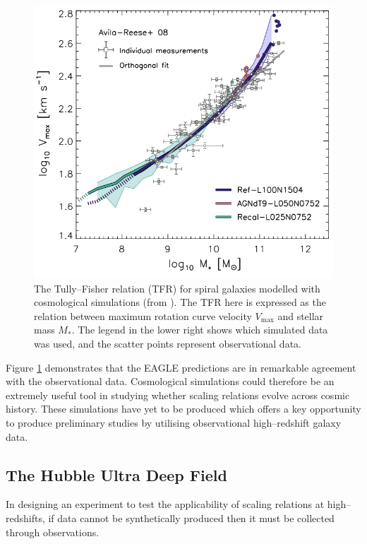 \documentclass[12pt, twocolumn, nofootinbib]{revtex4-1}    %
\begin{document}
\begin{figure}
\includegraphics[width=\linewidth]{introduction/eagle_tully_fisher}
\caption{The Tully--Fisher relation (TFR) for spiral galaxies modelled with cosmological simulations (from \citealt{2015MNRAS.446..521S}). The TFR here is expressed as the relation between maximum rotation curve velocity $V_{\max}$ and stellar mass $M_*$. The legend in the lower right shows which simulated data was used, and the scatter points represent observational data.}
\label{fig:eagle_tully_fisher}
\end{figure}

Figure \ref{fig:eagle_tully_fisher} demonstrates that the EAGLE predictions are in remarkable agreement with the observational data. Cosmological simulations could therefore be an extremely useful tool in studying whether scaling relations evolve across cosmic history. These simulations have yet to be produced which offers a key opportunity to produce preliminary studies by utilising observational high--redshift galaxy data.

\vspace{2ex} %
\subsection{The Hubble Ultra Deep Field}
\noindent
In designing an experiment to test the applicability of scaling relations at high--redshifts, if data cannot be synthetically produced then it must be collected through observations.
\end{document}
